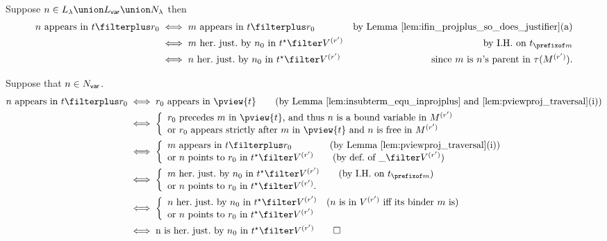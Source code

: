 Suppose $n \in L_\lambda \union L_{\sf var} \union N_\lambda$ then
\begin{align*}
\mbox{$n$ appears in $t\filterplus r_0$} &\iff \mbox{$m$ appears in $t\filterplus r_0$} & \mbox{by Lemma
\ref{lem:ifin_projplus_so_does_justifier}(a)} \\
&\iff \mbox{$m$ her.\ just.\ by $n_0$ in $t^\star\filter V^{(r')}$} & \mbox{by I.H.\ on $t_{\prefixof m}$} \\
&\iff \mbox{$n$ her.\ just.\ by $n_0$ in $t^\star\filter V^{(r')}$} & \mbox{since $m$ is $n$'s parent in $\tau(M^{(r')})$.}
\end{align*}

Suppose that $n \in N_{\sf var}$.
\begin{align*}
\mbox{$n$ appears in $t\filterplus r_0$} &\iff \mbox{$r_0$ appears in $\pview{t}$} \qquad
\mbox{(by Lemma \ref{lem:insubterm_equ_inprojplus} and \ref{lem:pviewproj_traversal}(i))} \\
&\iff \left\{
        \begin{array}{l}
          \hbox{$r_0$ precedes $m$ in $\pview{t}$, and thus $n$ is a bound variable in $M^{(r')}$} \\
          \hbox{or $r_0$ appears strictly after $m$ in $\pview{t}$ and $n$ is free in $M^{(r')}$}
        \end{array}
      \right. \\
&\iff \left\{
        \begin{array}{l}
          \hbox{$m$ appears in $t\filterplus r_0$} \qquad\qquad  \mbox{(by Lemma \ref{lem:pviewproj_traversal}(i))} \\
          \hbox{or $n$ points to $r_0$ in $t^\star\filter V^{(r')}$} \qquad \mbox{(by def.\ of $\_ \filter V^{(r')}$)}
        \end{array}
      \right. \\
&\iff \left\{
        \begin{array}{l}
          \hbox{$m$ her.\ just.\ by $n_0$ in $t^\star\filter V^{(r')}$} \qquad \mbox{(by I.H.\ on $t_{\prefixof m}$)} \\
          \hbox{or $n$ points to $r_0$ in $t^\star\filter V^{(r')}$.}
        \end{array}
      \right. \\
&\iff \left\{
        \begin{array}{l}
          \hbox{$n$ her.\ just.\ by $n_0$ in $t^\star\filter V^{(r')}$} \quad \mbox{($n$ is in $V^{(r')}$ iff its binder $m$ is)} \\
          \hbox{or $n$ points to $r_0$ in $t^\star\filter V^{(r')}$}
        \end{array}
      \right.\\
&\iff \hbox{n is her.\ just.\ by $n_0$ in $t^\star\filter V^{(r')}$}  \qed
\end{align*}

